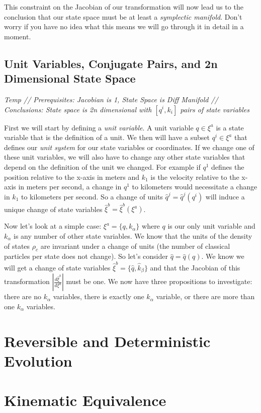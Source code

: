 \documentclass{article}
\begin{document}
This constraint on the Jacobian of our transformation will now lead us to the conclusion that our state space must be at least a \textit{symplectic manifold}. Don't worry if you have no idea what this means we will go through it in detail in a moment.

\subsection{Unit Variables, Conjugate Pairs, and 2n Dimensional State Space}
\textsl{Temp // Prerequisites: Jacobian is 1, State Space is Diff Manifold // Conclusions: State space is 2n dimensional with $[q^i,k_i]$ pairs of state variables}

	First we will start by defining a \textit{unit variable}. A unit variable $q \in \xi^a$ is a state variable that is the definition of a unit. We then will have a subset $q^i \in \xi^a$ that defines our \textit{unit system} for our state variables or coordinates. If we change one of these unit variables, we will also have to change any other state variables that depend on the definition of the unit we changed. For example if $q^1$ defines the position relative to the x-axis in meters and $k_1$ is the velocity relative to the x-axis in meters per second, a change in $q^1$ to kilometers would necessitate a change in $k_1$ to kilometers per second. So a change of units $\hat{q}^j = \hat{q}^j(q^i)$ will induce a unique change of state variables $\hat{\xi}^b = \hat{\xi}^b(\xi^a)$.
	
	Now let's look at a simple case: $\xi^a = \{q,k_\alpha\}$ where $q$ is our only unit variable and $k_\alpha$ is any number of other state variables. We know that the units of the density of states $\rho_c$ are invariant under a change of units (the number of classical particles per state does not change). So let's consider $\hat{q} = \hat{q}(q)$. We know we will get a change of state variables $\hat{\xi}^b = \{\hat{q},\hat{k}_\beta\}$ and that the Jacobian of this transformation $|\frac{d\hat{\xi}^b}{d\xi^a}|$ must be one. We now have three propositions to investigate: there are no $k_\alpha$ variables, there is exactly one $k_\alpha$ variable, or there are more than one $k_\alpha$ variables.
	
	
	
	
\section{Reversible and Deterministic Evolution}

\section{Kinematic Equivalence}
\end{document}

